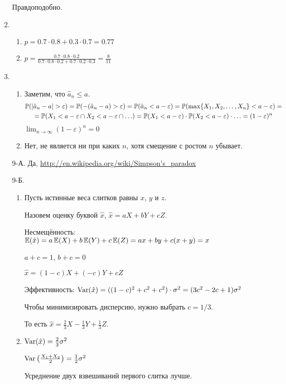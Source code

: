 \begin{enumerate}[resume]
\begin{enumerate}
Правдоподобно.
\item
\begin{enumerate}
\item $p=0.7\cdot 0.8+ 0.3\cdot 0.7=0.77$
\item $p=\frac{0.7\cdot0.8\cdot0.2}{0.7\cdot 0.8\cdot 0.2 + 0.7\cdot 0.2 \cdot 0.3}=\frac{8}{11}$
\end{enumerate}
\item
\begin{enumerate}
\item Заметим, что $\hat{a}_{n}\leq a$.
\begin{multline*}
\P(|\hat{a}_{n}-a|>\varepsilon)=\P(-(\hat{a}_{n}-a)>\varepsilon)=\P(\hat{a}_{n}<a-\varepsilon)=
\P(\max\{X_{1},X_{2}, \ldots, X_{n}\}<a-\varepsilon)= \\
=\P(X_{1}<a-\varepsilon \cap X_{2}< a-\varepsilon\cap \ldots)=
\P(X_{1}<a-\varepsilon)\cdot \P(X_{2}<a-\varepsilon)\cdot \ldots=(1-\varepsilon)^{n}
\end{multline*}
$\lim_{n\to\infty} (1-\varepsilon)^{n} =0$
\item Нет, не является ни при каких $n$, хотя смещение с ростом $n$ убывает.
\end{enumerate}
\item[9-А.] Да, \url{http://en.wikipedia.org/wiki/Simpson's_paradox}
\item[9-Б.]
\begin{enumerate}
\item Пусть истинные веса слитков равны $x$, $y$ и $z$.

Назовем оценку буквой $\hat{x}$, $\hat{x}=aX+bY+cZ$.

Несмещённость: $\operatorname{\mathbb{E}}(\hat{x})=a\operatorname{\mathbb{E}}(X)+b\operatorname{\mathbb{E}}(Y)+c\operatorname{\mathbb{E}}(Z)=ax+by+c(x+y)=x$

$a+c=1$, $b+c=0$

$\hat{x}=(1-c)X+(-c)Y+cZ$

Эффективность: $\operatorname{Var}(\hat{x})=((1-c)^{2}+c^{2}+c^{2})\cdot \sigma^{2}=(3c^{2}-2c+1)\sigma^{2}$

Чтобы минимизировать дисперсию, нужно выбрать $c=1/3$.

То есть $\hat{x}=\frac{2}{3}X-\frac{1}{3}Y+\frac{1}{3}Z$.
\item $\operatorname{Var}(\hat{x})=\frac{2}{3}\sigma^{2}$

$\operatorname{Var}\left(\frac{X_{1}+X_{2}}{2}\right)=\frac{1}{2}\sigma^{2}$

Усреднение двух взвешиваний первого слитка лучше.
\end{enumerate}
\end{enumerate}




\end{enumerate}
